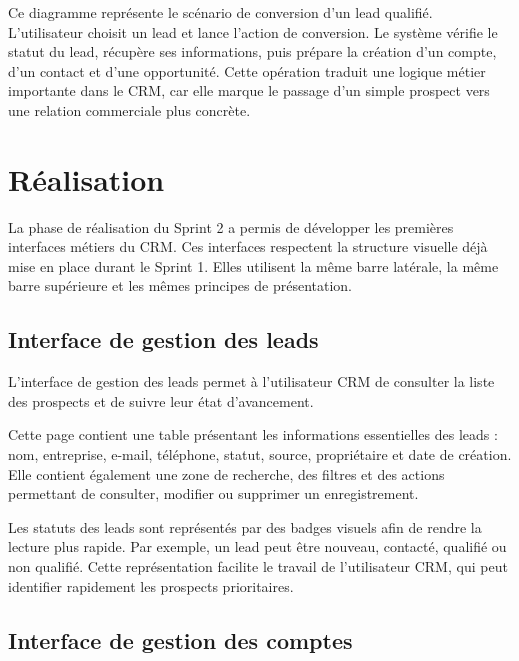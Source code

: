 \documentclass[12pt,a4paper]{report}
\begin{document}
Ce diagramme représente le scénario de conversion d’un lead qualifié. L’utilisateur choisit un lead et lance l’action de conversion. Le système vérifie le statut du lead, récupère ses informations, puis prépare la création d’un compte, d’un contact et d’une opportunité. Cette opération traduit une logique métier importante dans le CRM, car elle marque le passage d’un simple prospect vers une relation commerciale plus concrète.

\section{Réalisation}

La phase de réalisation du Sprint 2 a permis de développer les premières interfaces métiers du CRM. Ces interfaces respectent la structure visuelle déjà mise en place durant le Sprint 1. Elles utilisent la même barre latérale, la même barre supérieure et les mêmes principes de présentation.

\subsection{Interface de gestion des leads}

L’interface de gestion des leads permet à l’utilisateur CRM de consulter la liste des prospects et de suivre leur état d’avancement.


Cette page contient une table présentant les informations essentielles des leads : nom, entreprise, e-mail, téléphone, statut, source, propriétaire et date de création. Elle contient également une zone de recherche, des filtres et des actions permettant de consulter, modifier ou supprimer un enregistrement.

Les statuts des leads sont représentés par des badges visuels afin de rendre la lecture plus rapide. Par exemple, un lead peut être nouveau, contacté, qualifié ou non qualifié. Cette représentation facilite le travail de l’utilisateur CRM, qui peut identifier rapidement les prospects prioritaires.

\subsection{Interface de gestion des comptes}
\end{document}
